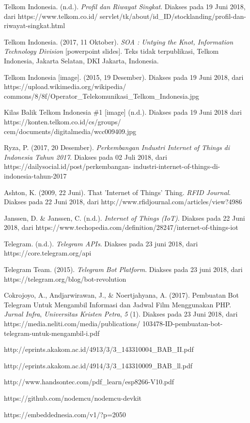 \begin{thebibliography}{9}
	
	Telkom Indonesia. (n.d.). \textit{Profil dan Riwayat Singkat}. Diakses pada 19 Juni 2018, dari  https://www.telkom.co.id/ servlet/tk/about/id\_ID/stocklanding/profil-dan-riwayat-singkat.html
	
	Telkom Indonesia. (2017, 11 Oktober). \textit{SOA : Untying the Knot, Information Technology Division} [powerpoint slides]. Teks tidak terpublikasi, Telkom Indonesia, Jakarta Selatan, DKI Jakarta, Indonesia. 
	

	Telkom Indonesia [image]. (2015, 19 Desember). Diakses pada 19 Juni 2018, dari https://upload.wikimedia.org/wikipedia/ commons/8/8f/Operator\_Telekomunikasi\_Telkom\_Indonesia.jpg
	

	Kilas Balik Telkom Indonesia \#1 [image] (n.d.). Diakses pada 19 Juni 2018 dari https://konten.telkom.co.id/cs/groups/ cem/documents/digitalmedia/wcc009409.jpg
	
	Ryza, P. (2017, 20 Desember). 
	\textit{Perkembangan Industri Internet of Things di Indonesia Tahun 2017}. Diakses pada 02 Juli 2018, dari https://dailysocial.id/post/perkembangan- industri-internet-of-things-di-indonesia-tahun-2017

	Ashton, K. (2009, 22 Juni). That 'Internet of Things' Thing. \textit{RFID Journal}. Diakses pada 22 Juni 2018, dari http://www.rfidjournal.com/articles/view?4986
	

	Janssen, D. \& Janssen, C. (n.d.). \textit{Internet of Things (IoT)}. Diakses pada 22 Juni 2018, dari https://www.techopedia.com/definition/28247/internet-of-things-iot
	

	Telegram. (n.d.). \textit{Telegram APIs}. Diakses pada 23 juni 2018, dari https://core.telegram.org/api
	

	Telegram Team. (2015). \textit{Telegram Bot Platform}. Diakses pada 23 juni 2018, dari https://telegram.org/blog/bot-revolution
	

	Cokrojoyo, A., Andjarwirawan, J., \&  Noertjahyana, A. (2017). Pembuatan Bot Telegram Untuk Mengambil Informasi dan Jadwal Film Menggunakan PHP. \textit{Jurnal Infra}, \textit{Universitas Kristen Petra}, \textit{5} (1). Diakses pada 23 Juni 2018, dari https://media.neliti.com/media/publications/ 103478-ID-pembuatan-bot-telegram-untuk-mengambil-i.pdf
	
	http://eprints.akakom.ac.id/4913/3/3\_143310004\_BAB\_II.pdf
	
	http://eprints.akakom.ac.id/4914/3/3\_143310009\_BAB\_ll.pdf 
	
	http://www.handsontec.com/pdf\_learn/esp8266-V10.pdf
	
	https://github.com/nodemcu/nodemcu-devkit
	
	https://embeddednesia.com/v1/?p=2050
\end{thebibliography}
